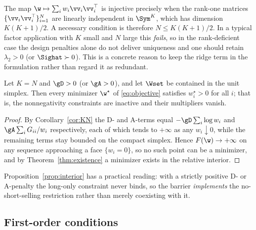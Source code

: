 \begin{remark}
\label{rem:injective}
The map $\w\mapsto\sum_iw_i\vv_i\vv_i^\top$ is injective precisely when the
rank-one matrices $\{\vv_i\vv_i^\top\}_{i=1}^{N}$ are linearly independent in
$\Sym^{K}$, which has dimension $K(K+1)/2$. A necessary condition is therefore
$N\le K(K+1)/2$. In a typical factor application with $K$ small and $N$ large
this \emph{fails}, so in the rank-deficient case the design penalties alone do
not deliver uniqueness and one should retain $\lambda_2>0$ (or $\Sighat\succ0$).
This is a concrete reason to keep the ridge term in the formulation rather than
regard it as redundant.
\end{remark}

\begin{proposition}[Interiority]
\label{prop:interior}
Let $K=N$ and $\gD>0$ (or $\gA>0$), and let $\Wset$ be contained in the unit
simplex. Then every minimizer $\w^\star$ of \eqref{eq:objective} satisfies
$w_i^\star>0$ for all $i$; that is, the nonnegativity constraints are inactive
and their multipliers vanish.
\end{proposition}

\begin{proof}
By Corollary~\ref{cor:KN} the D- and A-terms equal $-\gD\sum_i\log w_i$ and
$\gA\sum_iG_{ii}/w_i$ respectively, each of which tends to $+\infty$ as any
$w_i\downarrow0$, while the remaining terms stay bounded on the compact simplex.
Hence $F(\w)\to+\infty$ on any sequence approaching a face $\{w_i=0\}$, so no such
point can be a minimizer, and by Theorem~\ref{thm:existence} a minimizer exists in
the relative interior.
\end{proof}

Proposition~\ref{prop:interior} has a practical reading: with a strictly positive
D- or A-penalty the long-only constraint never binds, so the barrier
\emph{implements} the no-short-selling restriction rather than merely coexisting
with it.

\subsection{First-order conditions}

